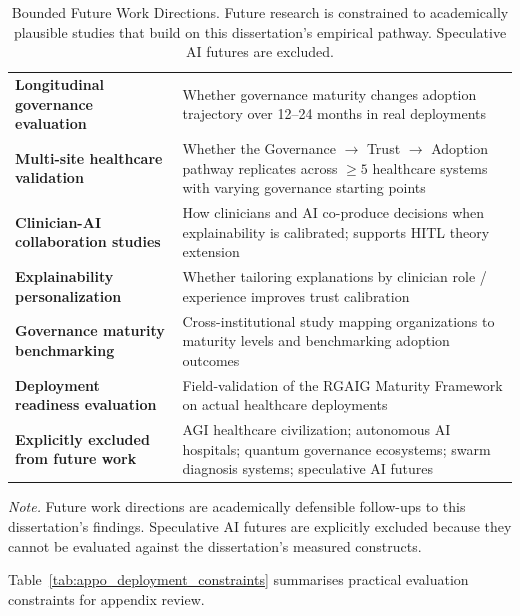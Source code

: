 {\tablestripes\tablefontsize
{}
\begin{xltabular}{\textwidth}{@{} >{\raggedright\arraybackslash}p{3.4cm} L @{}}
\caption[Bounded Future Work Directions]{Bounded Future Work Directions. Future research is constrained to academically plausible studies that build on this dissertation's empirical pathway. Speculative AI futures are excluded.}\label{tab:appo_future_work_bounded} \\
\toprule
{} &  \\
\midrule
\endfirsthead
\endhead
\bottomrule
\endlastfoot
\textbf{Longitudinal governance evaluation}   & Whether governance maturity changes adoption trajectory over 12--24 months in real deployments \\
\textbf{Multi-site healthcare validation}     & Whether the Governance $\to$ Trust $\to$ Adoption pathway replicates across $\geq 5$ healthcare systems with varying governance starting points \\
\textbf{Clinician-AI collaboration studies}   & How clinicians and AI co-produce decisions when explainability is calibrated; supports HITL theory extension \\
\textbf{Explainability personalization}       & Whether tailoring explanations by clinician role / experience improves trust calibration \\
\textbf{Governance maturity benchmarking}     & Cross-institutional study mapping organizations to maturity levels and benchmarking adoption outcomes \\
\textbf{Deployment readiness evaluation}      & Field-validation of the RGAIG Maturity Framework on actual healthcare deployments \\
\midrule
\textbf{Explicitly excluded from future work} & AGI healthcare civilization; autonomous AI hospitals; quantum governance ecosystems; swarm diagnosis systems; speculative AI futures \\
\end{xltabular}}
\vspace{0.4em}
\noindent\textit{Note.} Future work directions are academically defensible follow-ups to this dissertation's findings. Speculative AI futures are explicitly excluded because they cannot be evaluated against the dissertation's measured constructs.

\noindent Table~\ref{tab:appo_deployment_constraints} summarises practical evaluation constraints for appendix review.

